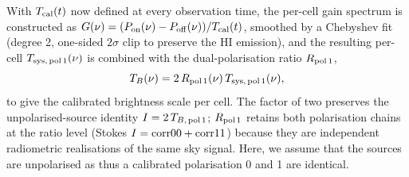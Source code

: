 \documentclass[10pt,preprint2]{aastex}
\begin{document}
With $T_{\rm cal}(t)$ now defined at every observation time, the per-cell gain spectrum is constructed as $G(\nu) = (P_{\rm on}(\nu) - P_{\rm off}(\nu)) / T_{\rm cal}(t)$, smoothed by a Chebyshev fit (degree 2, one-sided $2\sigma$ clip to preserve the HI emission), and the resulting per-cell $T_{\rm sys,\,pol\,1}(\nu)$ is combined with the dual-polarisation ratio $R_{\rm pol\,1}$,
\begin{equation*}
T_B(\nu) = 2\,R_{\rm pol\,1}(\nu)\,T_{\rm sys,\,pol\,1}(\nu),
\end{equation*}
to give the calibrated brightness scale per cell. The factor of two preserves the unpolarised-source identity $I = 2\,T_{B,\,{\rm pol\,1}}$; $R_{\rm pol\,1}$ retains both polarisation chains at the ratio level (Stokes $I = {\rm corr00} + {\rm corr11}$) because they are independent radiometric realisations of the same sky signal. Here, we assume that the sources are unpolarised as thus a calibrated polarisation 0 and 1 are identical.


\end{document}
